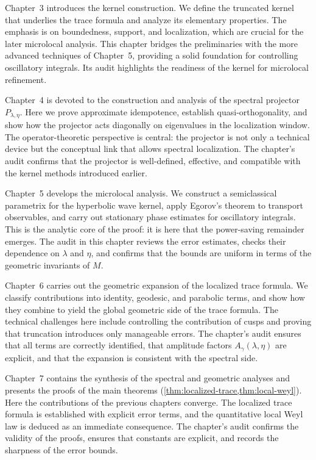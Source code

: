 Chapter~3 introduces the kernel construction. We define the truncated kernel
that underlies the trace formula and analyze its elementary properties. The
emphasis is on boundedness, support, and localization, which are crucial for
the later microlocal analysis. This chapter bridges the preliminaries with the
more advanced techniques of Chapter~5, providing a solid foundation for
controlling oscillatory integrals. Its audit highlights the readiness of the
kernel for microlocal refinement.

Chapter~4 is devoted to the construction and analysis of the spectral projector
$P_{\lambda,\eta}$. Here we prove approximate idempotence, establish
quasi-orthogonality, and show how the projector acts diagonally on eigenvalues
in the localization window. The operator-theoretic perspective is central: the
projector is not only a technical device but the conceptual link that allows
spectral localization. The chapter’s audit confirms that the projector is
well-defined, effective, and compatible with the kernel methods introduced
earlier.

Chapter~5 develops the microlocal analysis. We construct a semiclassical
parametrix for the hyperbolic wave kernel, apply Egorov’s theorem to transport
observables, and carry out stationary phase estimates for oscillatory
integrals. This is the analytic core of the proof: it is here that the
power-saving remainder emerges. The audit in this chapter reviews the error
estimates, checks their dependence on $\lambda$ and $\eta$, and confirms that
the bounds are uniform in terms of the geometric invariants of $M$.

Chapter~6 carries out the geometric expansion of the localized trace formula.
We classify contributions into identity, geodesic, and parabolic terms, and
show how they combine to yield the global geometric side of the trace formula.
The technical challenges here include controlling the contribution of cusps and
proving that truncation introduces only manageable errors. The chapter’s audit
ensures that all terms are correctly identified, that amplitude factors
$A_\gamma(\lambda,\eta)$ are explicit, and that the expansion is consistent
with the spectral side.

Chapter~7 contains the synthesis of the spectral and geometric analyses and
presents the proofs of the main theorems
(\cref{thm:localized-trace,thm:local-weyl}). Here the contributions of the
previous chapters converge. The localized trace formula is established with
explicit error terms, and the quantitative local Weyl law is deduced as an
immediate consequence. The chapter’s audit confirms the validity of the proofs,
ensures that constants are explicit, and records the sharpness of the error
bounds.

